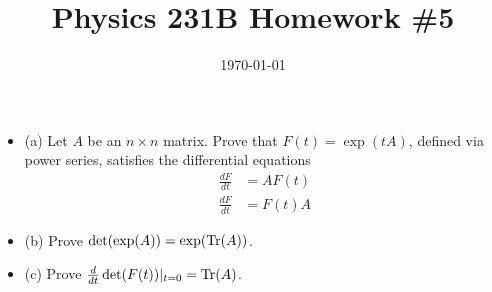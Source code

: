 \documentclass{article}
\date{\today}
\title{Physics 231B Homework \#5}
\begin{document}
\maketitle

\bigskip
\begin{prob}
    \begin{itemize}
        \item (a) Let $A$ be an $n \times n$ matrix. Prove that $F(t)=\exp(tA)$, defined via power series, satisfies the differential equations
            \begin{align*}
                \frac{dF}{dt}&=AF(t) \\
                \frac{dF}{dt}&=F(t)A
            \end{align*}
        \item (b) Prove $\det(\exp(A))=\exp(\operatorname{Tr}(A))$.
        \item (c) Prove $\frac{d}{dt}\det(F(t)) |_{t=0} = \operatorname{Tr}(A)$.
    \end{itemize}
\end{prob}
\end{document}
